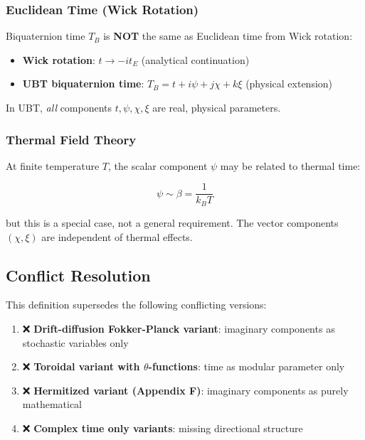 \subsubsection{Euclidean Time (Wick Rotation)}

Biquaternion time $T_B$ is \textbf{NOT} the same as Euclidean time from Wick rotation:

\begin{itemize}
    \item \textbf{Wick rotation}: $t \to -i t_E$ (analytical continuation)
    \item \textbf{UBT biquaternion time}: $T_B = t + i\psi + j\chi + k\xi$ (physical extension)
\end{itemize}

In UBT, \textit{all} components $t, \psi, \chi, \xi$ are real, physical parameters.

\subsubsection{Thermal Field Theory}

At finite temperature $T$, the scalar component $\psi$ may be related to thermal time:

\begin{equation}
\label{eq:canonical:thermal_psi}
\psi \sim \beta = \frac{1}{k_B T}
\end{equation}

but this is a special case, not a general requirement. The vector components $(\chi, \xi)$ are independent of thermal effects.

\subsection{Conflict Resolution}

This definition supersedes the following conflicting versions:

\begin{enumerate}
    \item ❌ \textbf{Drift-diffusion Fokker-Planck variant}: imaginary components as stochastic variables only
    \item ❌ \textbf{Toroidal variant with $\theta$-functions}: time as modular parameter only
    \item ❌ \textbf{Hermitized variant (Appendix F)}: imaginary components as purely mathematical
    \item ❌ \textbf{Complex time only variants}: missing directional structure
\end{enumerate}

